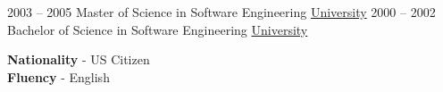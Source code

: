 \documentclass[9pt]{developercv} %
\begin{document}


\begin{entrylist}
	\entry
		{2003 -- 2005}
		{Master of Science in Software Engineering}
		{\href{https://www.university.com}{University}}
		{\lorem}
	\entry
		{2000 -- 2002}
		{Bachelor of Science in Software Engineering}
		{\href{https://www.university.com}{University}}
		{\lorem}
\end{entrylist}


\begin{minipage}[t]{0.3\textwidth}
	\vspace{-\baselineskip} %

	\textbf{Nationality} - US Citizen\\
	\textbf{Fluency} - English\\

\end{minipage}
\hfill
\begin{minipage}[t]{0.3\textwidth}
	\vspace{-\baselineskip} %
	
	
  \lorem
\end{minipage}
\hfill
\begin{minipage}[t]{0.3\textwidth}
	\vspace{-\baselineskip} %
	

  \lorem

\end{minipage}

\end{document}
